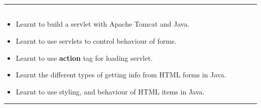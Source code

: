 \documentclass[12pt,letterpaper]{article}
\begin{document}
\hrule

\subsection*{}
\renewcommand{\labelitemi}{$\textendash$}
\begin{itemize}
    \item Learnt to build a servlet with Apache Tomcat and Java.
    \item Learnt to use servlets to control behaviour of forms.
    \item Learnt to use \textbf{action} tag for loading servlet.
    \item Learnt the different types of getting info from HTML forms in Java.
    \item Learnt to use styling, and behaviour of HTML items in Java.
\end{itemize}
\hrule
\end{document}
